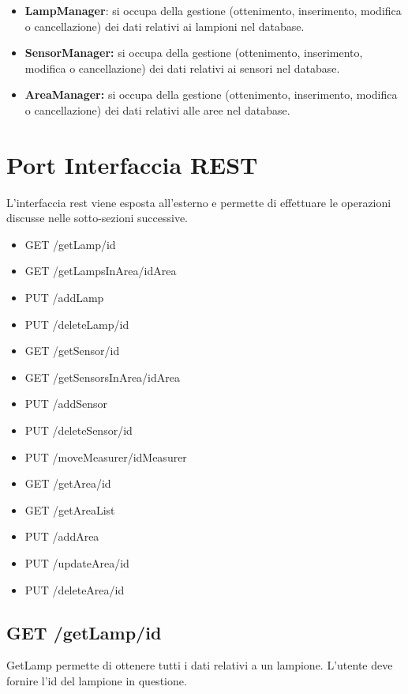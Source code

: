 \begin{itemize}
    \item \textbf{LampManager}: si occupa della gestione (ottenimento, inserimento, modifica o cancellazione) dei dati relativi ai lampioni nel database.
    \item \textbf{SensorManager:} si occupa della gestione (ottenimento, inserimento, modifica o cancellazione) dei dati relativi ai sensori nel database. 
    \item \textbf{AreaManager:} si occupa della gestione (ottenimento, inserimento, modifica o cancellazione) dei dati relativi alle aree nel database.
\end{itemize}

\section{Port Interfaccia REST}

L'interfaccia rest viene esposta all'esterno e permette di effettuare le operazioni discusse nelle sotto-sezioni successive.

\begin{itemize}
    \item GET /getLamp/id
    \item GET /getLampsInArea/idArea
    \item PUT /addLamp
    \item PUT /deleteLamp/id
    \item GET /getSensor/id
    \item GET /getSensorsInArea/idArea
    \item PUT /addSensor
    \item PUT /deleteSensor/id
    \item PUT /moveMeasurer/idMeasurer
    \item GET /getArea/id
    \item GET /getAreaList
    \item PUT /addArea
    \item PUT /updateArea/id
    \item PUT /deleteArea/id
\end{itemize}

\subsection{ GET /getLamp/id}

GetLamp permette di ottenere tutti i dati relativi a un lampione. L'utente deve fornire l'id del lampione in questione.

